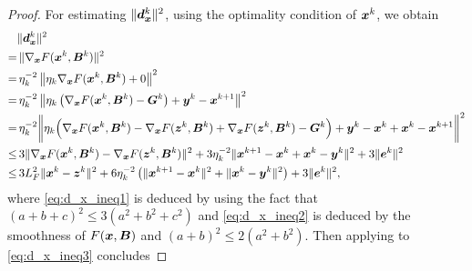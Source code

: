 \begin{proof}
    For estimating $\| \bm{d}_{\bm{x}}^{k}\|^{2}$, using the optimality condition of
    $\bm{x}^{k}$, we obtain
    {\small
    \begin{align}
             & \|\bm{d}_{\bm{x}}^{k}\|^{2}\notag                                                                                                                                                                                                                   \\
        =    & \,\|\nabla_{\bm{x}}F(\bm{x}^{k}, \bm{B}^{k}) \|^{2}\notag                                                                                                                                                                                           \\
        =    & \,\eta_{k}^{-2}\left\| \eta_{k}\nabla_{\bm{x}}F(\bm{x}^{k}, \bm{B}^{k}) + 0\right\|^{2}\notag                                                                                                                                                       \\
        =    & \, \eta_{k}^{-2}\left\|\eta_{k}\left( \nabla_{\bm{x}}F(\bm{x}^{k}, \bm{B}^{k}) - \bm{G}^{k}\right) + \bm{y}^{k}- \bm{x}^{k+1}\right\|^{2}\notag                                                                                                           \\
        =    & \,\eta_{k}^{-2}\bigg\|\eta_{k}\Big( \nabla_{\bm{x}}F(\bm{x}^{k}, \bm{B}^{k}) - \nabla_{\bm{x}}F(\bm{z}^{k}, \bm{B}^{k}) + \nabla_{\bm{x}}F(\bm{z}^{k}, \bm{B}^{k})- \bm{G}^{k}\Big) + \bm{y}^{k}- \bm{x}^{k}+ \bm{x}^{k}- \bm{x}^{k+1}\bigg\|^{2}\label{eq:d_x_ineq1} \\
        \leq & \, 3 \|\nabla_{\bm{x}}F(\bm{x}^{k}, \bm{B}^{k}) - \nabla_{\bm{x}}F(\bm{z}^{k}, \bm{B}^{k})\|^{2}+ 3\eta_{k}^{-2}\|\bm{x}^{k+1}- \bm{x}^{k}+ \bm{x}^{k}- \bm{y}^{k}\|^{2}+ 3 \|\bm{e}^{k}\|^{2}\label{eq:d_x_ineq2}                                                 \\
        \leq & \, 3L_{F}^{2}\|\bm{x}^{k}- \bm{z}^{k}\|^{2}+ 6\eta_{k}^{-2}\left(\|\bm{x}^{k+1}- \bm{x}^{k}\|^{2}+ \|\bm{x}^{k}- \bm{y}^{k}\|^{2}\right) + 3 \|\bm{e}^{k}\|^{2},\label{eq:d_x_ineq3}                                                                      
    \end{align}}where \eqref{eq:d_x_ineq1} is deduced by using the fact that
    $(a + b+ c)^{2}\leq 3(a^{2}+ b^{2}+c^{2})$ and \eqref{eq:d_x_ineq2} is deduced
    by the smoothness of $F(\bm{x}, \bm{B})$ and $(a + b)^{2}\leq 2(a^{2}+ b^{2})$.
    Then applying  to \eqref{eq:d_x_ineq3} concludes

\end{proof}
